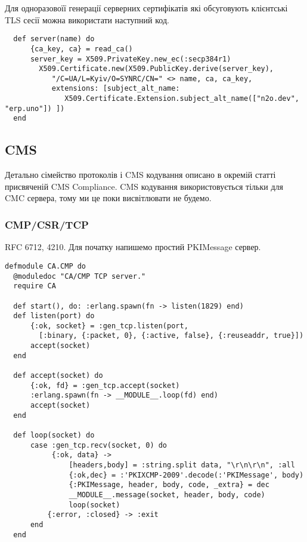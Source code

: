 Для одноразовоїї генерації серверних сертифікатів які обсуговують клієнтські TLS сесії можна використати наступний код.

\begin{lstlisting}
  def server(name) do
      {ca_key, ca} = read_ca()
      server_key = X509.PrivateKey.new_ec(:secp384r1)
        X509.Certificate.new(X509.PublicKey.derive(server_key),
           "/C=UA/L=Kyiv/O=SYNRC/CN=" <> name, ca, ca_key,
           extensions: [subject_alt_name:
              X509.Certificate.Extension.subject_alt_name(["n2o.dev", "erp.uno"]) ])
  end
\end{lstlisting}

\newpage
\subsection{CMS}

Детально сімейство протоколів і CMS кодування описано в окремій статті присвяченій CMS Compliance. CMS кодування використовується тільки для CMC сервера, тому ми це поки висвітлювати не будемо.

\subsubsection{CMP/CSR/TCP}

RFC 6712, 4210. Для початку напишемо простий PKIMessage сервер.

\begin{lstlisting}
defmodule CA.CMP do
  @moduledoc "CA/CMP TCP server."
  require CA

  def start(), do: :erlang.spawn(fn -> listen(1829) end)
  def listen(port) do
      {:ok, socket} = :gen_tcp.listen(port,
        [:binary, {:packet, 0}, {:active, false}, {:reuseaddr, true}])
      accept(socket)
  end

  def accept(socket) do
      {:ok, fd} = :gen_tcp.accept(socket)
      :erlang.spawn(fn -> __MODULE__.loop(fd) end)
      accept(socket)
  end

  def loop(socket) do
      case :gen_tcp.recv(socket, 0) do
           {:ok, data} ->
               [headers,body] = :string.split data, "\r\n\r\n", :all
               {:ok,dec} = :'PKIXCMP-2009'.decode(:'PKIMessage', body)
               {:PKIMessage, header, body, code, _extra} = dec
               __MODULE__.message(socket, header, body, code)
               loop(socket)
          {:error, :closed} -> :exit
      end
  end
\end{lstlisting}

